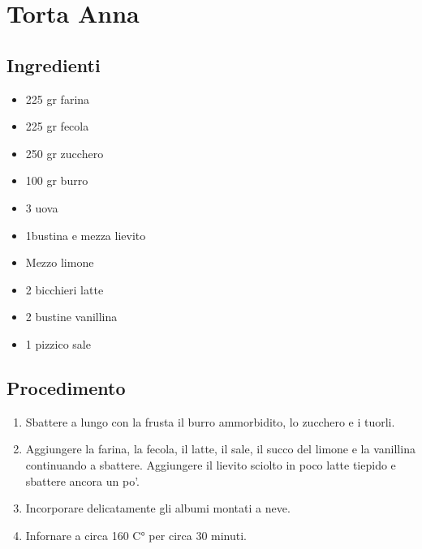 \section{Torta Anna}
\subsection{Ingredienti}
\begin{itemize}
\item 225 gr farina   
\item 225 gr fecola   
\item 250 gr zucchero  
\item 100 gr burro  
\item 3 uova  
\item 1bustina e mezza lievito  
\item Mezzo limone   
\item 2 bicchieri latte  
\item 2 bustine vanillina   
\item 1 pizzico sale
\end{itemize}
\subsection{Procedimento}
\begin{enumerate}
\item  Sbattere a lungo con la frusta il burro ammorbidito, lo zucchero e i tuorli.  
\item  Aggiungere la farina, la fecola, il latte, il sale, il succo del limone e la vanillina continuando a sbattere. Aggiungere il lievito sciolto in poco latte tiepido e sbattere ancora un po'.  
\item  Incorporare delicatamente gli albumi montati a neve.  
\item  Infornare a circa 160 C° per circa 30 minuti.
\end{enumerate}
